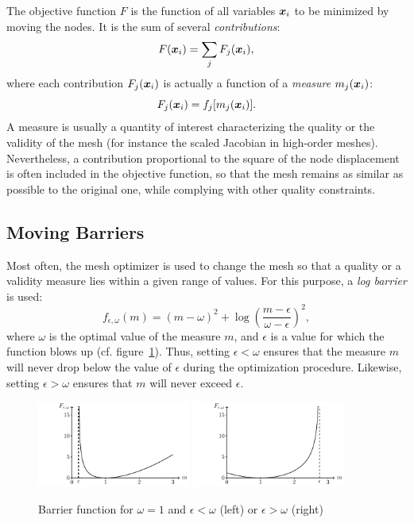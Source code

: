 \documentclass[12pt,a4paper,a4wide]{article}
\renewcommand{\vec}[1]{\ensuremath{\text{\boldmath $#1$\unboldmath}}}
\newcommand{\mvx}{\vec{x}}
\begin{document}
The objective function $F$ is the function of all variables $\mvx_i$
to be minimized by moving the nodes. It is the sum of several
\emph{contributions}:
\[
F(\mvx_i) = \sum_{j} F_j(\mvx_i),
\]
where each contribution $F_j(\mvx_i)$ is actually a function of
a \emph{measure} $m_j(\mvx_i)$:
\[
F_j(\mvx_i) = f_j[m_j(\mvx_i)].
\]
A measure is usually a quantity of interest
characterizing the quality or the validity of the mesh (for
instance the scaled Jacobian in high-order meshes). Nevertheless,
a contribution proportional to the square of the node displacement
is often included in the objective function, so that the mesh
remains as similar as possible to the original one, while complying
with other quality constraints.


\subsection{Moving Barriers}

Most often, the mesh optimizer is used to change the mesh so that a
quality or a validity measure lies within a given range of values.
For this purpose, a \emph{log barrier} is used:
\[
f_{\epsilon,\omega}(m) = (m - \omega)^2 +
\log\left(\frac{m-\epsilon}{\omega-\epsilon}\right)^2,
\]
where $\omega$ is the optimal value of the measure $m$, and $\epsilon$
is a value for which the function blows up (cf.
figure~\ref{fig:barrier}). Thus, setting $\epsilon<\omega$ ensures that
the measure $m$ will never drop below the value of $\epsilon$ during the
optimization procedure. Likewise, setting $\epsilon>\omega$ ensures that
$m$ will never exceed $\epsilon$.

\begin{figure}
\centering
\includegraphics[width=0.45\textwidth]{log_barrier/log_barrier}
\includegraphics[width=0.45\textwidth]{log_barrier/log_barrier_max}
\caption{Barrier function for $\omega=1$ and
$\epsilon<\omega$ (left) or $\epsilon>\omega$
(right)\label{fig:barrier}}
\end{figure}
\end{document}
